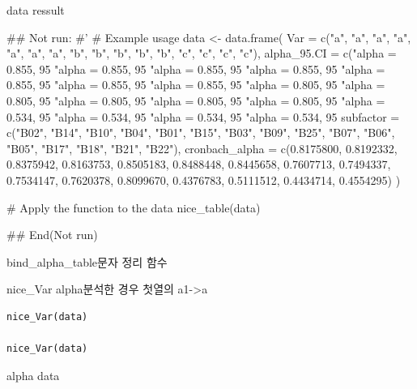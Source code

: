 \documentclass[a4paper]{book}
\begin{document}
%
\begin{Value}
data ressult
\end{Value}
%
\begin{Examples}
\begin{ExampleCode}

## Not run: 
#'
# Example usage
data <- data.frame(
  Var = c("a", "a", "a", "a", "a", "a", "a", "b",
  "b", "b", "b", "b", "c", "c", "c", "c"),
  alpha_95.CI = c("alpha = 0.855, 95%
  "alpha = 0.855, 95%
                  "alpha = 0.855, 95%
                  "alpha = 0.855, 95%
                  "alpha = 0.855, 95%
                  "alpha = 0.855, 95%
                  "alpha = 0.855, 95%
                  "alpha = 0.805, 95%
                  "alpha = 0.805, 95%
                  "alpha = 0.805, 95%
                  "alpha = 0.805, 95%
                  "alpha = 0.805, 95%
                  "alpha = 0.534, 95%
                  "alpha = 0.534, 95%
                  "alpha = 0.534, 95%
                  "alpha = 0.534, 95%
  subfactor = c("B02", "B14", "B10", "B04", "B01", "B15",
   "B03", "B09", "B25", "B07", "B06", "B05", "B17",
   "B18", "B21", "B22"),
  cronbach_alpha = c(0.8175800, 0.8192332,
  0.8375942, 0.8163753, 0.8505183, 0.8488448,
   0.8445658, 0.7607713, 0.7494337,
                     0.7534147, 0.7620378,
                      0.8099670, 0.4376783,
                       0.5111512, 0.4434714, 0.4554295)
)

# Apply the function to the data
nice_table(data)


## End(Not run)


\end{ExampleCode}
\end{Examples}
%
\begin{Description}
bind\_alpha\_table문자 정리 함수

nice\_Var alpha분석한 경우 첫열의 a1->a
\end{Description}
%
\begin{Usage}
\begin{verbatim}
nice_Var(data)

nice_Var(data)
\end{verbatim}
\end{Usage}
%
\begin{Arguments}
\begin{ldescription}
\item[\code{data}] alpha data
\end{ldescription}
\end{Arguments}
\end{document}
